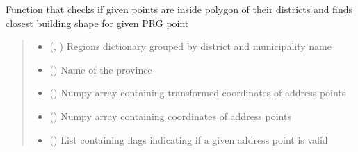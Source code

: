 \documentclass[letterpaper,10pt,english]{sphinxmanual}
\begin{document}
\begin{fulllineitems}
\label{\detokenize{geo_utilities:geo_utilities.points_inside_polygon}}
\pysigstartsignatures
{}
\pysigstopsignatures
\sphinxAtStartPar
Function that checks if given points are inside polygon of their districts and finds closest building shape for
given PRG point
\begin{quote}\begin{description}
\begin{itemize}
\item {} 
\sphinxAtStartPar
{} (\sphinxcode{\sphinxupquote{Dict}}{[}, \sphinxcode{\sphinxupquote{ndarray}}{]}) \textendash{} Regions dictionary grouped by district and municipality name

\item {} 
\sphinxAtStartPar
{} () \textendash{} Name of the province

\item {} 
\sphinxAtStartPar
{} () \textendash{} Numpy array containing transformed coordinates of address points

\item {} 
\sphinxAtStartPar
{} () \textendash{} Numpy array containing coordinates of address points

\item {} 
\sphinxAtStartPar
{} (\sphinxcode{\sphinxupquote{List}}{[}\sphinxcode{\sphinxupquote{int}}{]}) \textendash{} List containing flags indicating if a given address point is valid


\end{itemize}
\end{description}
\end{quote}
\end{fulllineitems}
\end{document}
